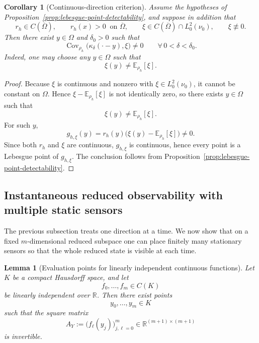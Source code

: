 \documentclass{article}
\newtheorem{lemma}[theorem]{Lemma}
\newtheorem{corollary}[theorem]{Corollary}
\theoremstyle{definition}
\begin{document}
\begin{corollary}[Continuous-direction criterion]
    \label{cor:continuous-direction-detectability}
    Assume the hypotheses of Proposition~\ref{prop:lebesgue-point-detectability}, and suppose in
    addition that
    \[
        r_h\in C(\overline\Omega),
        \qquad
        r_h(x)>0\ \text{ on }\overline\Omega,
        \qquad
        \xi\in C(\overline\Omega)\cap L^2_0(\nu_0),
        \qquad
        \xi\not\equiv 0.
    \]
    Then there exist \(y\in\Omega\) and \(\delta_0>0\) such that
    \[
        \operatorname{Cov}_{\rho_h}\!\bigl(\kappa_\delta(\cdot-y),\xi\bigr)\neq 0
        \qquad
        \forall\,0<\delta<\delta_0.
    \]
    Indeed, one may choose any \(y\in\Omega\) such that
    \[
        \xi(y)\neq \mathbb E_{\rho_h}[\xi].
    \]
\end{corollary}

\begin{proof}
    Because \(\xi\) is continuous and nonzero with \(\xi\in L^2_0(\nu_0)\), it cannot be constant on
    \(\Omega\). Hence \(\xi-\mathbb E_{\rho_h}[\xi]\) is not identically zero, so there exists
    \(y\in\Omega\) such that
    \[
        \xi(y)\neq \mathbb E_{\rho_h}[\xi].
    \]
    For such \(y\),
    \[
        g_{h,\xi}(y)=r_h(y)\bigl(\xi(y)-\mathbb E_{\rho_h}[\xi]\bigr)\neq 0.
    \]
    Since both \(r_h\) and \(\xi\) are continuous, \(g_{h,\xi}\) is continuous, hence every point is a
    Lebesgue point of \(g_{h,\xi}\). The conclusion follows from
    Proposition~\ref{prop:lebesgue-point-detectability}.
\end{proof}

\subsection{Instantaneous reduced observability with multiple static sensors}

The previous subsection treats one direction at a time. We now show that on a fixed
\(m\)-dimensional reduced subspace one can place finitely many stationary sensors so that the
whole reduced state is visible at each time.

\begin{lemma}[Evaluation points for linearly independent continuous functions]
    \label{lem:evaluation-points-independent}
    Let \(K\) be a compact Hausdorff space, and let
    \[
        f_0,\dots,f_m\in C(K)
    \]
    be linearly independent over \(\mathbb R\). Then there exist points
    \[
        y_0,\dots,y_m\in K
    \]
    such that the square matrix
    \[
        A_Y
        :=
        \bigl(f_\ell(y_j)\bigr)_{j,\ell=0}^m
        \in\mathbb R^{(m+1)\times(m+1)}
    \]
    is invertible.
\end{lemma}
\end{document}
